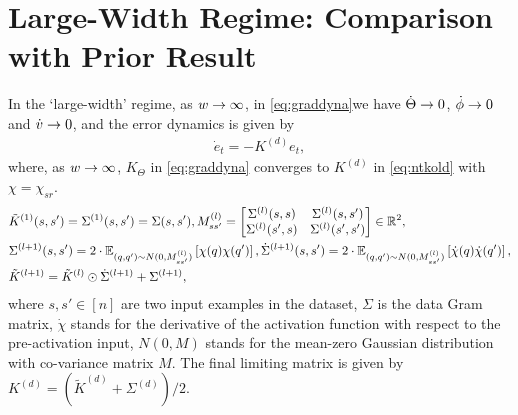 \section{Large-Width Regime: Comparison with Prior Result}\label{sec:exact}
In the `large-width' regime, as $w\rightarrow\infty$, in \eqref{eq:graddyna}we have $\dot{\Theta}\rightarrow 0$, $\dot{\phi}\rightarrow 0$ and $\dot{v}\rightarrow 0$, and the error dynamics is given by
\begin{align}
\dot{e}_t=-K^{(d)} e_t,
\end{align}
where, as $w\rightarrow\infty$, $K_{\Theta}$ in \eqref{eq:graddyna} converges to $K^{(d)}$ in \eqref{eq:ntkold} with $\chi=\chi_{sr}$. 
\begin{align}\label{eq:ntkold}
&\tilde{K}^{(1)}(s,s')=\Sigma^{(1)}(s,s')=\Sigma(s,s'), M^{(l)}_{ss'}=\left[\begin{matrix}\Sigma^{(l)}(s,s) & \Sigma^{(l)}(s,s')\\ \Sigma^{(l)}(s',s) & \Sigma^{(l)}(s',s')\end{matrix}\right]\in \mathbb{R}^2,\\
&\Sigma^{(l+1)}(s,s')= 2\cdot\mathbb{E}_{(q,q')\sim N(0,M_{ss'}^{(l)})} \left[\chi(q)\chi(q')\right], \dot{\Sigma}^{(l+1)}(s,s')= 2\cdot\mathbb{E}_{(q,q')\sim N(0,M_{ss'}^{(l)})}\left[\dot{\chi}(q)\dot{\chi}(q')\right],\nonumber\\
&\tilde{K}^{(l+1)}=\tilde{K}^{(l)}\odot \dot{\Sigma}^{(l+1)}+\Sigma^{(l+1)},\nonumber
\end{align}
where $s,s'\in[n]$ are two input examples in the dataset, $\Sigma$ is the data Gram matrix, $\dot{\chi}$ stands for the derivative of the activation function with respect to the pre-activation input, $N(0,M)$ stands for the mean-zero Gaussian distribution with co-variance matrix $M$. The final limiting matrix is given by $K^{(d)}=\left(\tilde{K}^{(d)}+\Sigma^{(d)}\right)/2$. 

